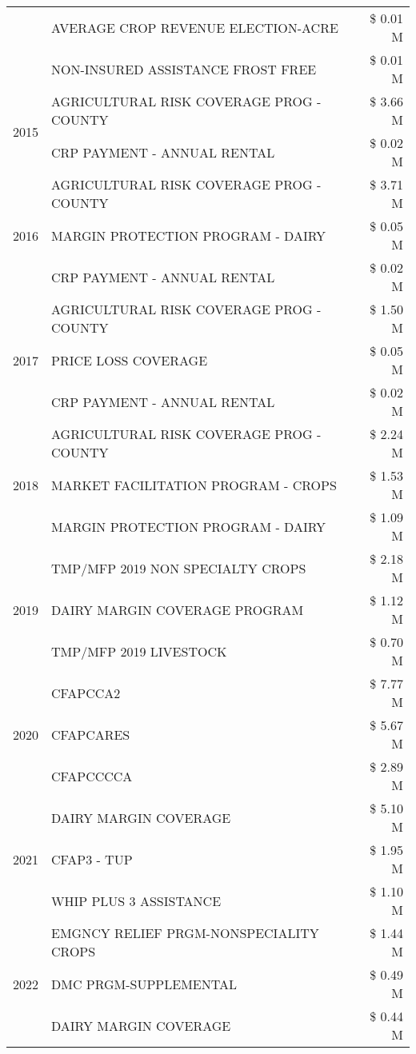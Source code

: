 \begin{tabular}{llr}
 & AVERAGE CROP REVENUE ELECTION-ACRE & \$ 0.01 M \\
 & NON-INSURED ASSISTANCE FROST FREE & \$ 0.01 M \\
\cline{1-3}
\multirow[t]{2}{*}{2015} & AGRICULTURAL RISK COVERAGE PROG - COUNTY & \$ 3.66 M \\
 & CRP PAYMENT - ANNUAL RENTAL & \$ 0.02 M \\
\cline{1-3}
\multirow[t]{3}{*}{2016} & AGRICULTURAL RISK COVERAGE PROG - COUNTY & \$ 3.71 M \\
 & MARGIN PROTECTION PROGRAM - DAIRY & \$ 0.05 M \\
 & CRP PAYMENT - ANNUAL RENTAL & \$ 0.02 M \\
\cline{1-3}
\multirow[t]{3}{*}{2017} & AGRICULTURAL RISK COVERAGE PROG - COUNTY & \$ 1.50 M \\
 & PRICE LOSS COVERAGE & \$ 0.05 M \\
 & CRP PAYMENT - ANNUAL RENTAL & \$ 0.02 M \\
\cline{1-3}
\multirow[t]{3}{*}{2018} & AGRICULTURAL RISK COVERAGE PROG - COUNTY & \$ 2.24 M \\
 & MARKET FACILITATION PROGRAM - CROPS & \$ 1.53 M \\
 & MARGIN PROTECTION PROGRAM - DAIRY & \$ 1.09 M \\
\cline{1-3}
\multirow[t]{3}{*}{2019} & TMP/MFP 2019 NON SPECIALTY CROPS & \$ 2.18 M \\
 & DAIRY MARGIN COVERAGE PROGRAM & \$ 1.12 M \\
 & TMP/MFP 2019 LIVESTOCK & \$ 0.70 M \\
\cline{1-3}
\multirow[t]{3}{*}{2020} & CFAPCCA2 & \$ 7.77 M \\
 & CFAPCARES & \$ 5.67 M \\
 & CFAPCCCCA & \$ 2.89 M \\
\cline{1-3}
\multirow[t]{3}{*}{2021} & DAIRY MARGIN COVERAGE & \$ 5.10 M \\
 & CFAP3 - TUP & \$ 1.95 M \\
 & WHIP PLUS 3 ASSISTANCE & \$ 1.10 M \\
\cline{1-3}
\multirow[t]{3}{*}{2022} & EMGNCY RELIEF PRGM-NONSPECIALITY CROPS & \$ 1.44 M \\
 & DMC PRGM-SUPPLEMENTAL & \$ 0.49 M \\
 & DAIRY MARGIN COVERAGE & \$ 0.44 M \\
\cline{1-3}
\bottomrule
\end{tabular}

